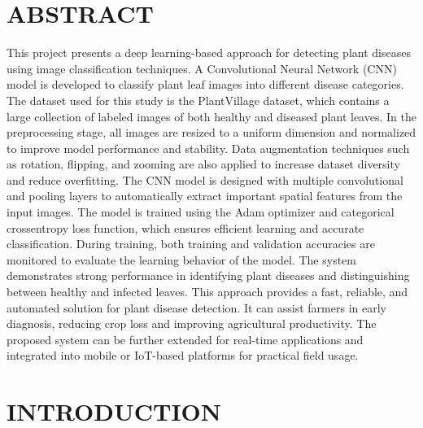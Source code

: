 \documentclass[12pt]{report}
\begin{document}
\chapter*{ABSTRACT}
This project presents a deep learning-based approach for detecting plant diseases using image classification techniques. A Convolutional Neural Network (CNN) model is developed to classify plant leaf images into different disease categories. The dataset used for this study is the PlantVillage dataset, which contains a large collection of labeled images of both healthy and diseased plant leaves. In the preprocessing stage, all images are resized to a uniform dimension and normalized to improve model performance and stability. Data augmentation techniques such as rotation, flipping, and zooming are also applied to increase dataset diversity and reduce overfitting. The CNN model is designed with multiple convolutional and pooling layers to automatically extract important spatial features from the input images. The model is trained using the Adam optimizer and categorical crossentropy loss function, which ensures efficient learning and accurate classification. During training, both training and validation accuracies are monitored to evaluate the learning behavior of the model. The system demonstrates strong performance in identifying plant diseases and distinguishing between healthy and infected leaves. This approach provides a fast, reliable, and automated solution for plant disease detection. It can assist farmers in early diagnosis, reducing crop loss and improving agricultural productivity. The proposed system can be further extended for real-time applications and integrated into mobile or IoT-based platforms for practical field usage.


\newpage

\listoffigures

\newpage

\listoftables

\newpage

\tableofcontents
\newpage


\chapter{INTRODUCTION}
\end{document}
